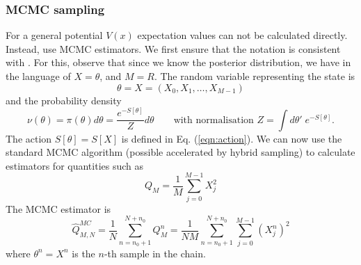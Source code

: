 \documentclass[11pt]{article}
\renewcommand{\vec}[1]{{#1}}
\begin{document}
\subsubsection{MCMC sampling}
For a general potential $V(x)$ expectation values can not be calculated directly. Instead, use MCMC estimators. We first ensure that the notation is consistent with \cite{Dodwell2015}. For this, observe that since we know the posterior distribution, we have in the language of \cite{Dodwell2015} $X=\theta$, and $M=R$. The random variable representing the state is
\begin{equation}
  \theta = \vec{X} = (X_0,X_1,\dots,X_{M-1})
\end{equation}
and the probability density
\begin{equation}
  \nu(\theta) = \pi(\theta)d\theta =\frac{e^{-S[\theta]}}{Z}d\theta\qquad\text{with normalisation $Z=\int d\theta'\; e^{-S[\theta]}$}.
\end{equation}
The action $S[\theta]=S[X]$ is defined in Eq. (\ref{eqn:action}). We can now use the standard MCMC algorithm (possible accelerated by hybrid sampling) to calculate estimators for quantities such as
\begin{equation}
  Q_M = \frac{1}{M} \sum_{j=0}^{M-1} X_j^2
\end{equation}
The MCMC estimator is
\begin{equation}
  \hat{Q}_{M,N}^{MC} = \frac{1}{N}\sum_{n=n_0+1}^{N+n_0} Q_M^n =
  \frac{1}{NM} \sum_{n=n_0+1}^{N+n_0} \sum_{j=0}^{M-1} \left(X^n_{j}\right)^2
\end{equation}
where $\theta^n = X^n$ is the $n$-th sample in the chain.
\end{document}
